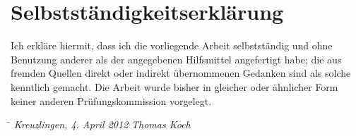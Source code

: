 \documentclass[12pt,a4paper,twoside]{scrartcl}		%
\begin{document}


\newpage
{}

\section*{Selbstständigkeitserklärung}
\thispagestyle{empty}
Ich erkläre hiermit, dass ich die vorliegende Arbeit selbstständig und ohne
Benutzung anderer als der angegebenen Hilfsmittel angefertigt habe; die aus
fremden Quellen direkt oder indirekt übernommenen Gedanken sind als solche
kenntlich gemacht.  Die Arbeit wurde bisher in gleicher oder ähnlicher Form
keiner anderen Prüfungskommission vorgelegt.
\vspace{3cm}
\begin{tabbing}
\hspace{6cm}  \= \kill
\textit{Kreuzlingen, 4. April 2012} \> \textit{Thomas Koch}
\end{tabbing}
\end{document}
